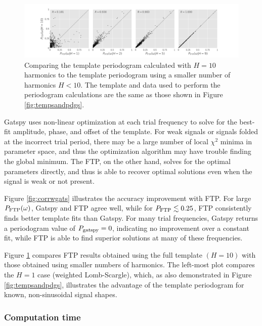 \documentclass[iop]{emulateapj}
\begin{document}
\begin{figure}
    \centering
    \includegraphics[width=\textwidth]{plots/correlation_with_large_H.png}
    \caption{\label{fig:corrwhighh} Comparing the template periodogram calculated with $H=10$ harmonics
            to the template periodogram using a smaller number of harmonics $H < 10$. The template and
            data used to perform the periodogram calculations are the same as those shown in Figure \ref{fig:tempsandpdgs}.}    
\end{figure}

Gatspy uses non-linear optimization at each trial frequency to solve
for the best-fit amplitude, phase, and offset of the template. For
weak signals or signals folded at the incorrect trial period, there
may be a large number of local $\chi^2$ minima in parameter space, and thus
the optimization algorithm may have trouble finding the global minimum. The 
FTP, on the other hand, solves for the optimal parameters directly, and
thus is able to recover optimal solutions even when the signal is weak
or not present.

Figure \ref{fig:corrwgats} illustrates the accuracy improvement with FTP.
For large $P_{\rm FTP}(\omega)$, Gatspy and FTP agree well, while for
$P_{\rm FTP} \lesssim 0.25$, FTP consistently finds better template fits
than Gatspy. For many trial frequencies, Gatspy returns a periodogram value
of $P_{\rm gatspy} = 0$, indicating no improvement over a constant fit,
while FTP is able to find superior solutions at many of these frequencies.

Figure \ref{fig:corrwhighh} compares FTP results obtained using the full template
$(H=10)$ with those obtained using smaller numbers of harmonics. The left-most
plot compares the $H=1$ case (weighted Lomb-Scargle), which, as also demonstrated
in Figure \ref{fig:tempsandpdgs}, illustrates the advantage of the template
periodogram for known, non-sinusoidal signal shapes.


\subsubsection{Computation time}
\end{document}
